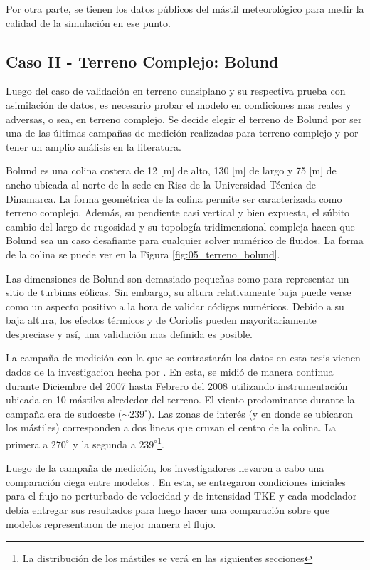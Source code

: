 Por otra parte, se tienen los datos públicos del mástil meteorológico para medir la calidad de la simulación en ese punto.
\subsection{Caso II - Terreno Complejo: Bolund}
Luego del caso de validación en terreno cuasiplano y su respectiva prueba con asimilación de datos, es necesario probar el modelo en condiciones mas reales y adversas, o sea, en terreno complejo. Se decide elegir el terreno de Bolund por ser una de las últimas campañas de medición realizadas para terreno complejo y por tener un amplio análisis en la literatura.

Bolund es una colina costera de 12 [m] de alto, 130 [m] de largo y 75 [m] de ancho ubicada al norte de la sede en Risø de la Universidad Técnica de Dinamarca. La forma geométrica de la colina permite ser caracterizada como terreno complejo. Además, su pendiente casi vertical y bien expuesta, el súbito cambio del largo de rugosidad y su topología tridimensional compleja hacen que Bolund sea un caso desafiante para cualquier solver numérico de fluidos. La forma de la colina se puede ver en la Figura \ref{fig:05_terreno_bolund}.

Las dimensiones de Bolund son demasiado pequeñas como para representar un sitio de turbinas eólicas. Sin embargo, su altura relativamente baja puede verse como un aspecto positivo a la hora de validar códigos numéricos. Debido a su baja altura, los efectos térmicos y de Coriolis pueden mayoritariamente despreciase y así, una validación mas definida es posible.

La campaña de medición con la que se contrastarán los datos en esta tesis vienen dados de la investigacion hecha por \cite{3d4285ac04444eb3b9775baf9af052c6}. En esta, se midió de manera continua durante Diciembre del 2007 hasta Febrero del 2008 utilizando instrumentación ubicada en 10 mástiles alrededor del terreno.  El viento predominante durante la campaña era de sudoeste ($\sim\!239^\circ$). Las zonas de interés (y en donde se ubicaron los mástiles) corresponden a dos lineas que cruzan el centro de la colina. La primera a $270^\circ$ y la segunda a $239^\circ$\footnote{La distribución de los mástiles se verá en las siguientes secciones}.

Luego de la campaña de medición, los investigadores llevaron a cabo una comparación ciega entre modelos \citep{Bechmann2011}. En esta, se entregaron condiciones iniciales para el flujo no perturbado de velocidad y de intensidad TKE y cada modelador debía entregar sus resultados para luego hacer una comparación sobre que modelos representaron de mejor manera el flujo.

